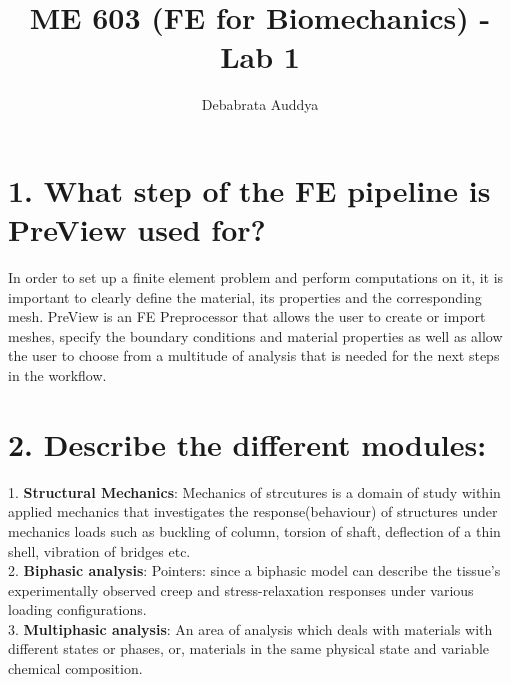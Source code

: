 \documentclass[a4paper,oneside,11pt]{report}
\title{ME 603 (FE for Biomechanics) - Lab 1}
\author{Debabrata Auddya}
\begin{document}
\maketitle
\section*{1. What step of the FE pipeline is PreView used for?}
In order to set up a finite element problem and perform computations on it, it is important to clearly define the material, its properties and the corresponding mesh. PreView is an FE Preprocessor that allows the user to create or import meshes, specify the boundary conditions and material properties as well as allow the user to choose from a multitude of analysis that is needed for the next steps in the workflow.  
\section*{2. Describe the different modules:}
1. \textbf{Structural Mechanics}:
Mechanics of strcutures is a domain of study within applied mechanics that investigates the response(behaviour) of structures under mechanics loads such as buckling of column, torsion of shaft, deflection of a thin shell, vibration of bridges etc.\\
2. \textbf{Biphasic analysis}:
Pointers: since a
biphasic model can describe the tissue’s experimentally observed creep and stress-relaxation
responses under various loading configurations. \\
3. \textbf{Multiphasic analysis}: An area of analysis which deals with materials with different states or phases, or, materials in the same physical state and variable chemical composition. 
\end{document}
